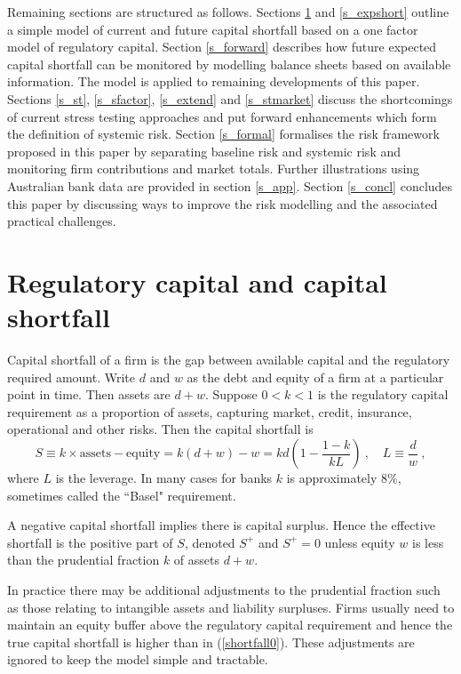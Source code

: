 \documentclass[authoryear]{elsarticle}
\newcommand{\cq}{\ ,\quad }
\newcommand{\be}[1]{\begin{equation}\label{#1}}
\newcommand{\ee}{\end{equation}}
\newcommand{\eref}[1]{(\ref{#1})}
\newcommand{\aref}[1]{\ref{#1}}
\begin{document}
Remaining sections are structured as follows. Sections  \aref{s_capmodel} and \aref{s_expshort} outline a simple model of current and future capital shortfall based on a one factor model of regulatory capital. Section \aref{s_forward} describes how future expected capital shortfall can be monitored by modelling balance sheets based on available information. The model is applied to remaining developments of this paper. Sections \aref{s_st}, \aref{s_sfactor}, \aref{s_extend} and \aref{s_stmarket}  discuss the shortcomings of current stress testing approaches and put forward enhancements which form the definition of systemic risk. Section \aref{s_formal} formalises the risk framework proposed in this paper by separating baseline risk and systemic risk and monitoring firm contributions and market totals. Further illustrations using Australian bank data are provided in section \aref{s_app}. Section \aref{s_concl} concludes this paper by discussing ways to improve the risk modelling and the associated practical challenges.


\section{Regulatory capital and capital shortfall}\label{s_capmodel}


Capital shortfall of a firm is the gap between available capital and the regulatory required amount. Write $d$ and $w$ as the debt and equity of a firm at a particular point in time. Then assets are $d+w$. Suppose $0<k<1$ is the regulatory capital requirement as a proportion of assets, capturing market, credit, insurance, operational and other risks.   Then the capital shortfall is
\be{shortfall0}
 S\equiv k\times\mathrm{assets} - \mathrm{equity} = k (d+w)-w = k d\left(1-\frac{1-k}{kL}\right)\cq L\equiv \frac{d}{w} \ ,
\ee
where $L$ is the leverage.  In many cases for banks $k$  is approximately 8\%, sometimes called the ``Basel" requirement. 

A negative capital shortfall implies  there is capital surplus.   Hence the effective shortfall is  the positive part of $S$, denoted $S^+$ and  $S^+=0$  unless equity $w$ is less than the prudential fraction $k$ of assets $d+w$.

In practice there  may be additional adjustments to the prudential fraction such as those relating to intangible assets and liability surpluses. Firms usually need to maintain an equity buffer above the regulatory capital requirement and hence the true capital shortfall is higher than in \eref{shortfall0}. These adjustments are ignored to keep the model simple and tractable.
\end{document}

